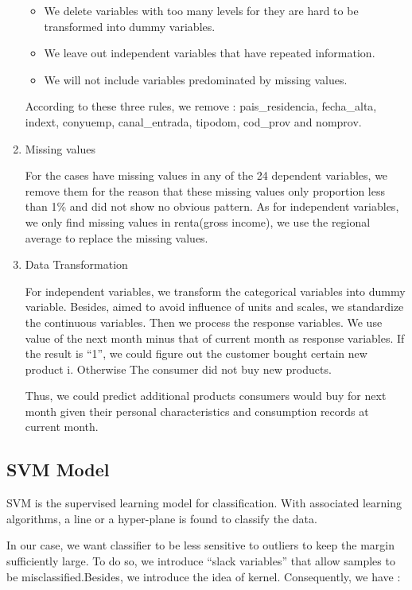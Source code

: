 \documentclass{article}
\begin{document}
\begin{spacing}{1}
\begin{large}
\begin{enumerate}
	\begin{itemize}
		\item  We delete variables with too many levels for they are hard to be transformed into dummy variables.
		
		\item We leave out independent variables that have repeated information.
		
		\item We will not include  variables predominated by missing values.
	\end{itemize}
	
	According to these three  rules, we remove : pais\_residencia, fecha\_alta, indext, conyuemp, canal\_entrada, tipodom, cod\_prov and nomprov.
	
	\item  Missing values
	
	For the cases have missing values in any of the 24 dependent variables, we remove them for the reason that these missing values only proportion less than 1\% and did not show no obvious pattern. As for independent variables, we only find missing values in renta(gross income), we use the regional average to replace the missing values.
	
	\item Data Transformation
	
	For independent variables, we transform the categorical variables into dummy variable. Besides, aimed to avoid influence of units and scales, we standardize the continuous variables. Then we process the response variables. We use  value of the next month minus that of  current month as response variables. If the result is “1”, we could figure out the customer bought certain new product i. Otherwise The consumer did not buy new products.
	
	Thus, we could predict additional products consumers would buy for next month given their personal characteristics and consumption records at current month.
\end{enumerate}

\subsection{SVM Model}

SVM is the supervised learning model for classification. With associated learning algorithms, a line or a hyper-plane is found to classify the data.

In our case, we want classifier to be less sensitive to outliers to keep the margin sufficiently large. To do so, we introduce “slack variables” that allow samples to be misclassified.Besides, we introduce the idea of kernel. Consequently, we have :


\end{large}
\end{spacing}
\end{document}
